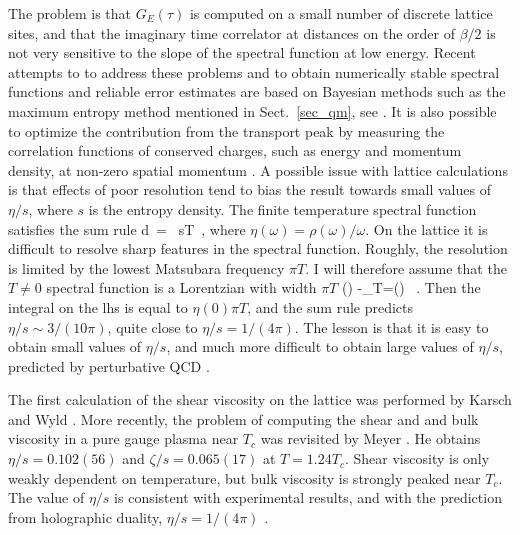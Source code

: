  The problem is that $G_E(\tau)$ is computed on a small number of 
discrete lattice sites, and that the imaginary time correlator 
at distances on the order of $\beta/2$ is not very sensitive to the 
slope of the spectral function at low energy. Recent attempts to 
to address these problems and to obtain numerically stable spectral 
functions and reliable error estimates are based on Bayesian methods
such as the maximum entropy method mentioned in Sect.~\ref{sec_qm}, 
see \cite{Aarts:2007wj,Aarts:2007va}. It is also possible to 
optimize the contribution from the transport peak by measuring 
the correlation functions of conserved charges, such as energy and 
momentum density, at non-zero spatial momentum 
\cite{Aarts:2006wt,Meyer:2008gt}. A possible issue with lattice 
calculations is that effects of poor resolution tend to bias the result
towards small values of $\eta/s$, where $s$ is the entropy density. 
The finite temperature spectral function satisfies 
the sum rule \cite{Romatschke:2009ng}
\be 
{} \int d\omega\, 
  \left[ \eta(\omega) -\eta_{T\!=\!0}(\omega)\right] = 
  \, sT\, , 
\ee
where $\eta(\omega) = \rho(\omega)/\omega$. On the lattice it is 
difficult to resolve sharp features in the spectral function. Roughly,
the resolution is limited by the lowest Matsubara frequency $\pi T$. I 
will therefore assume that the $T\neq 0$ spectral function is a Lorentzian
with width $\pi T$
\be
\eta(\omega) -\eta_{T\!=}(\omega) \simeq
 \, . 
\ee
Then the integral on the lhs is equal to $\eta(0)\pi T$, and the sum
rule predicts $\eta/s\sim 3/(10\pi)$, quite close to $\eta/s=1/(4\pi)$. 
The lesson is that it is easy to obtain small values of $\eta/s$, and 
much more difficult to obtain large values of $\eta/s$, predicted by 
perturbative QCD \cite{Arnold:2000dr}. 

 The first calculation of the shear viscosity on the lattice was 
performed by Karsch and Wyld \cite{Karsch:1986cq}. More recently, the 
problem of computing the shear and and bulk viscosity in a pure gauge
plasma near $T_c$ was revisited by Meyer \cite{Meyer:2007ic,Meyer:2008gt}. 
He obtains $\eta/s=0.102(56)$ and $\zeta/s=0.065(17)$ at $T=1.24T_c$. Shear 
viscosity is only weakly dependent on temperature, but bulk viscosity is
strongly peaked near $T_c$. The value of $\eta/s$ is consistent with 
experimental results, and with the prediction from holographic duality,
$\eta/s=1/(4\pi)$ \cite{Kovtun:2004de}. 

 

